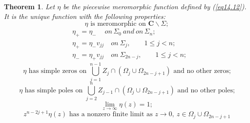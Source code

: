\documentclass{surv-l}
\theoremstyle{plain}
\newtheorem{theorem}{Theorem}[section]
\theoremstyle{definition}
\numberwithin{equation}{chapter}
\begin{document}
\begin{theorem}\label{thm14.13}
Let $\eta$  be the piecewise meromorphic function defined by \emph{(\ref{eq14.12})}. It is the unique function with the following properties:
\setcounter{equation}{13}
\begin{equation}\label{eq14.14}
\eta\text{ is meromorphic on } \mathbf{C}\backslash \Sigma;
\end{equation}
\begin{align}\label{eq14.15}
&\eta_{+}=\eta_{-}\quad\ on\, \Sigma_{0}\ and \ on\, \Sigma_{n};\\\nonumber
&\eta_{+}=\eta_{-}v_{jj}\quad  on\ \Sigma_{j},\qquad 1\leq j<n; \\\nonumber
&\eta_{-}=\eta_{+}v_{jj}\quad on\ \Sigma_{2n-j},\qquad  1\leq j <n;
\end{align}
\begin{equation}\label{eq14.16}
\eta\text{ has simple zeros on } \bigcup_{j=1}^{n-1}Z_{j}\cap(\Omega_{j}\cup\Omega_{2n-j+1})\text{  and no other zeros;}
\end{equation}
\begin{equation}\label{eq14.17}
\eta \text{ has simple poles on }\bigcup_{j=2}^{n}Z_{j-1}\cap(\Omega_{j}\cup\Omega_{2n-j+1})\text{ and no  other poles;}
\end{equation}
\begin{equation}\label{eq14.18}
\lim_{z\rightarrow\infty}\eta(z)=1;
\end{equation}
\begin{equation}\label{eq14.19}
z^{n-2j+1}\eta(z)\text{ has a  nonzero finite limit as }z\rightarrow 0,\ z\in\Omega_{j}\cup\Omega_{2n-j+1}
\end{equation}
\end{theorem}
\end{document}
